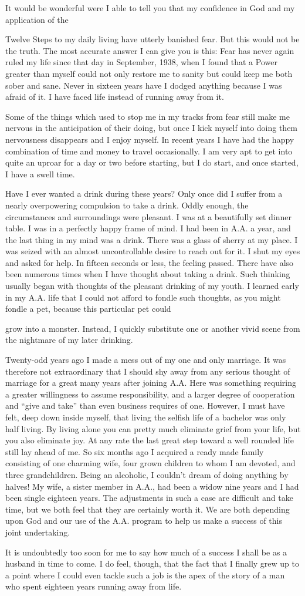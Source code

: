 It would be wonderful were I able to tell you that my confidence in God and my application of the

Twelve Steps to my daily living have utterly banished fear. But this would not be the truth. The most accurate answer I can give you is this: Fear has never again ruled my life since that day in September, 1938, when I found that a Power greater than myself could not only restore me to sanity but could keep me both sober and sane. Never in sixteen years have I dodged anything because I was afraid of it. I have faced life instead of running away from it.

Some of the things which used to stop me in my tracks from fear still make me nervous in the anticipation of their doing, but once I kick myself into doing them nervousness disappears and I enjoy myself. In recent years I have had the happy combination of time and money to travel occasionally. I am very apt to get into quite an uproar for a day or two before starting, but I do start, and once started, I have a swell time.

Have I ever wanted a drink during these years? Only once did I suffer from a nearly overpowering compulsion to take a drink. Oddly enough, the circumstances and surroundings were pleasant. I was at a beautifully set dinner table. I was in a perfectly happy frame of mind. I had been in A.A. a year, and the last thing in my mind was a drink. There was a glass of sherry at my place. I was seized with an almost uncontrollable desire to reach out for it. I shut my eyes and asked for help. In fifteen seconds or less, the feeling passed. There have also been numerous times when I have thought about taking a drink. Such thinking usually began with thoughts of the pleasant drinking of my youth. I learned early in my A.A. life that I could not afford to fondle such thoughts, as you might fondle a pet, because this particular pet could

grow into a monster. Instead, I quickly substitute one or another vivid scene from the nightmare of my later drinking.

Twenty-odd years ago I made a mess out of my one and only marriage. It was therefore not extraordinary that I should shy away from any serious thought of marriage for a great many years after joining A.A. Here was something requiring a greater willingness to assume responsibility, and a larger degree of cooperation and “give and take” than even business requires of one. However, I must have felt, deep down inside myself, that living the selfish life of a bachelor was only half living. By living alone you can pretty much eliminate grief from your life, but you also eliminate joy. At any rate the last great step toward a well rounded life still lay ahead of me. So six months ago I acquired a ready made family consisting of one charming wife, four grown children to whom I am devoted, and three grandchildren. Being an alcoholic, I couldn’t dream of doing anything by halves! My wife, a sister member in A.A., had been a widow nine years and I had been single eighteen years. The adjustments in such a case are difficult and take time, but we both feel that they are certainly worth it. We are both depending upon God and our use of the A.A. program to help us make a success of this joint undertaking.

It is undoubtedly too soon for me to say how much of a success I shall be as a husband in time to come. I do feel, though, that the fact that I finally grew up to a point where I could even tackle such a job is the apex of the story of a man who spent eighteen years running away from life.
